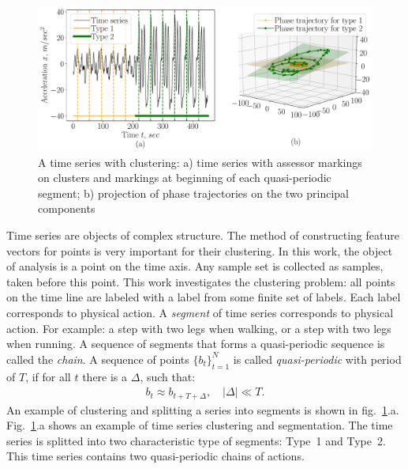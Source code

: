 \documentclass[12pt, twoside]{article}
\numberwithin{equation}{section}
\begin{document}
\begin{figure}[h!t]\center
\includegraphics[width=1\textwidth]{results_eng/introduction}
\caption{A time series with clustering:  a) time series with assessor markings on clusters and markings at beginning of each quasi-periodic segment; b) projection of phase trajectories on the two principal components}
\label{fig:introduction:1}
\end{figure}

Time series are objects of complex structure. 
The method of constructing feature vectors for points is very important for their clustering.
In this work, the object of analysis is a point on the time axis.
Any sample set is collected as samples, taken before this point.
This work investigates the clustering problem: all points on the time line are labeled with a label from some finite set of labels.
Each label corresponds to physical action.
A \textit{segment} of time series corresponds to physical action. For example: a step with two legs when walking, or a step with two legs when running.
A sequence of segments that forms a quasi-periodic sequence is called the \textit{chain}.
A sequence of points $\{b_t\}_{t=1}^{N}$ is called \textit{quasi-periodic} with period of $T$, if for all $t$ there is a $\Delta$, such that:
\begin{equation}
\label{eq:int:1}
\begin{aligned}
b_t \approx b_{t+T+\Delta}, \quad \left|\Delta\right| \ll T.
\end{aligned}
\end{equation}
An example of clustering and splitting a series into segments is shown in fig.~\ref{fig:introduction:1}.a. 
Fig.~\ref{fig:introduction:1}.a shows an example of time series clustering and segmentation.
The time series is splitted into two characteristic type of segments: Type~1 and Type~2. 
This time series contains two quasi-periodic chains of actions.
\end{document}

